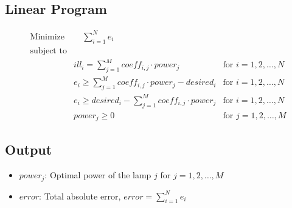 \documentclass{article}
\begin{document}
\subsection*{Linear Program}
\begin{align*}
\text{Minimize} & \quad \sum_{i=1}^{N} e_i \\
\text{subject to} & \\
& ill_i = \sum_{j=1}^{M} coeff_{i,j} \cdot power_j & \text{for } i = 1, 2, \ldots, N \\
& e_i \geq \sum_{j=1}^{M} coeff_{i,j} \cdot power_j - desired_i & \text{for } i = 1, 2, \ldots, N \\
& e_i \geq desired_i - \sum_{j=1}^{M} coeff_{i,j} \cdot power_j & \text{for } i = 1, 2, \ldots, N \\
& power_j \geq 0 & \text{for } j = 1, 2, \ldots, M
\end{align*}

\subsection*{Output}
\begin{itemize}
    \item $power_j$: Optimal power of the lamp $j$ for $j = 1, 2, \ldots, M$
    \item $error$: Total absolute error, $error = \sum_{i=1}^{N} e_i$
\end{itemize}
\end{document}
